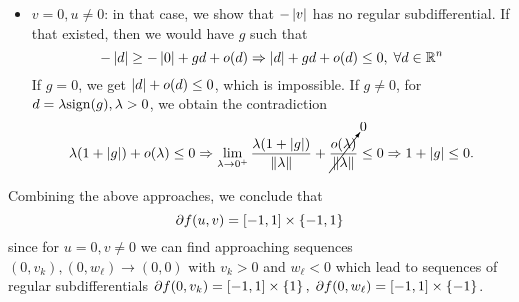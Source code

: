 \documentclass[10pt]{article}
\begin{document}
\begin{itemize}
\item $v = 0, u \neq 0$: in that case, we show that $-\left| v \right|$ has no regular
subdifferential. If that existed, then we would have $g$ such that
\[
    -\left| d \right| \geq -\left| 0 \right| + g d + o(d) \Rightarrow \left| d \right| + g d + o(d) \leq 0,
    \; \forall d \in \mathbb{R}^n
\]
If $g = 0$, we get $\left| d \right| + o(d) \leq 0$, which is impossible. If $g \neq 0$,
for $d = \lambda \mathrm{sign}(g), \lambda > 0$, we obtain the contradiction
\[
    \lambda (1 + \left| g \right|) + o(\lambda) \leq 0 \Rightarrow
    \lim_{\lambda \to 0^+} \frac{\lambda (1 + \left| g \right|)}{\left \| \lambda \right \|}
    + \cancelto{0}{\frac{o(\lambda)}{\left \| \lambda \right \|}} \leq 0 \Rightarrow
    1 + \left| g \right| \leq 0.
\]
\end{itemize}
Combining the above approaches, we conclude that
\[
    \partial f(u, v) = [-1, 1] \times \left\{ -1, 1 \right\}
\]
since for $u = 0, v \neq 0$ we can find approaching sequences $(0, v_k), (0,
w_{\ell}) \to (0, 0)$ with $v_k > 0$ and $w_{\ell} < 0$ which lead to sequences
of regular subdifferentials $\partial f(0, v_k) = [-1, 1] \times \left\{ 1 \right\}, \;
\partial f(0, w_{\ell}) = [-1, 1] \times \left\{ -1 \right\}$.
\end{document}
